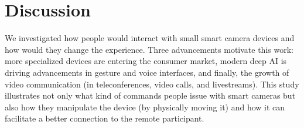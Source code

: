 \documentclass{tufte-handout}
\begin{document}




\section{Discussion}
We investigated how people would interact with small smart camera
devices and how would they change the experience. Three advancements
motivate this work: more specialized devices are entering the consumer
market, modern deep AI is driving advancements in gesture and voice
interfaces, and finally, the growth of video communication (in
teleconferences, video calls, and livestreams). This study illustrates
not only what kind of commands people issue with smart cameras but
also how they manipulate the device (by physically moving it) and how
it can facilitate a better connection to the remote participant.
\end{document}
